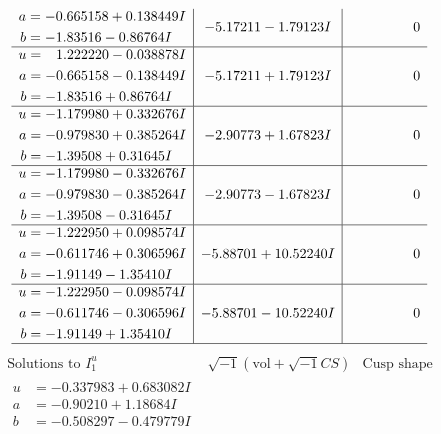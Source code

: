 \documentclass[1p]{elsarticle_modified}
\theoremstyle{definition}
\newcommand{\I}{\sqrt{-1}}
\begin{document}
$$\begin{array}{c|c|c}
\begin{aligned}
a &= -0.665158 + 0.138449 I \\
b &= -1.83516 - 0.86764 I\end{aligned}
 & -5.17211 - 1.79123 I & \phantom{-0.000000 } 0 \\ \hline\begin{aligned}
u &= \phantom{-}1.222220 - 0.038878 I \\
a &= -0.665158 - 0.138449 I \\
b &= -1.83516 + 0.86764 I\end{aligned}
 & -5.17211 + 1.79123 I & \phantom{-0.000000 } 0 \\ \hline\begin{aligned}
u &= -1.179980 + 0.332676 I \\
a &= -0.979830 + 0.385264 I \\
b &= -1.39508 + 0.31645 I\end{aligned}
 & -2.90773 + 1.67823 I & \phantom{-0.000000 } 0 \\ \hline\begin{aligned}
u &= -1.179980 - 0.332676 I \\
a &= -0.979830 - 0.385264 I \\
b &= -1.39508 - 0.31645 I\end{aligned}
 & -2.90773 - 1.67823 I & \phantom{-0.000000 } 0 \\ \hline\begin{aligned}
u &= -1.222950 + 0.098574 I \\
a &= -0.611746 + 0.306596 I \\
b &= -1.91149 - 1.35410 I\end{aligned}
 & -5.88701 + 10.52240 I & \phantom{-0.000000 } 0 \\ \hline\begin{aligned}
u &= -1.222950 - 0.098574 I \\
a &= -0.611746 - 0.306596 I \\
b &= -1.91149 + 1.35410 I\end{aligned}
 & -5.88701 - 10.52240 I & \phantom{-0.000000 } 0\\
 \hline 
 \end{array}$$\newpage$$\begin{array}{c|c|c}  
\text{Solutions to }I^u_{1}& \I (\text{vol} + \sqrt{-1}CS) & \text{Cusp shape}\\
 \hline 
\begin{aligned}
u &= -0.337983 + 0.683082 I \\
a &= -0.90210 + 1.18684 I \\
b &= -0.508297 - 0.479779 I\end{aligned}

\end{array}$$
\end{document}

